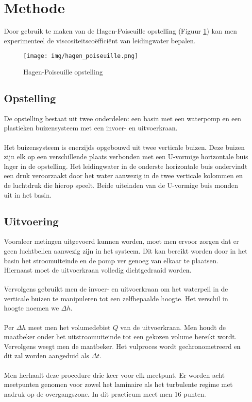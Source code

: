 \section{Methode}

Door gebruik te maken van de Hagen-Poiseuille opstelling (Figuur \ref{fig:hagen-pois}) 
kan men experimenteel de viscositeitsco\"effici\"ent van leidingwater bepalen. \\

\begin{figure}[h]
    \centering
    \caption{Hagen-Poiseuille opstelling}
    \texttt{[image: img/hagen\_poiseuille.png]}
    \label{fig:hagen-pois}
\end{figure}

\subsection{Opstelling}

De opstelling bestaat uit twee onderdelen: een basin
met een waterpomp en een plastieken buizensysteem met
een invoer- en uitvoerkraan.
\\ \\
Het buizensysteem is enerzijds opgebouwd uit twee verticale 
buizen. Deze buizen zijn elk op een verschillende plaats 
verbonden met een U-vormige horizontale buis lager in de opstelling.
Het leidingwater in de onderste horizontale buis ondervindt een 
druk veroorzaakt door het water aanwezig in de twee verticale
kolommen en de luchtdruk die hierop speelt. Beide uiteinden van de 
U-vormige buis monden uit in het basin.

\subsection{Uitvoering}

Vooraleer metingen uitgevoerd kunnen worden, moet men ervoor zorgen 
dat er geen luchtbellen aanwezig zijn in het systeem. 
Dit kan bereikt worden door in het basin het stroomuiteinde en de pomp
ver genoeg van elkaar te plaatsen. Hiernaast moet de uitvoerkraan 
volledig dichtgedraaid worden.
\\ \\
Vervolgens gebruikt men de invoer- en uitvoerkraan om
het waterpeil in de verticale buizen te manipuleren tot
een zelfbepaalde hoogte. Het verschil in hoogte noemen we
$\Delta h$.
\\ \\
Per $\Delta h$ meet men het volumedebiet $Q$ van de
uitvoerkraan. Men houdt de maatbeker onder het uitstroomuiteinde 
tot een gekozen volume bereikt wordt.
Vervolgens weegt men de maatbeker. Het vulproces wordt gechronometreerd
en dit zal worden aangeduid als $\Delta t$.
\\ \\
Men herhaalt deze procedure drie keer voor elk meetpunt. 
Er worden acht meetpunten genomen voor zowel het laminaire
als het turbulente regime met nadruk op de overgangszone. In dit practicum
meet men 16 punten.

